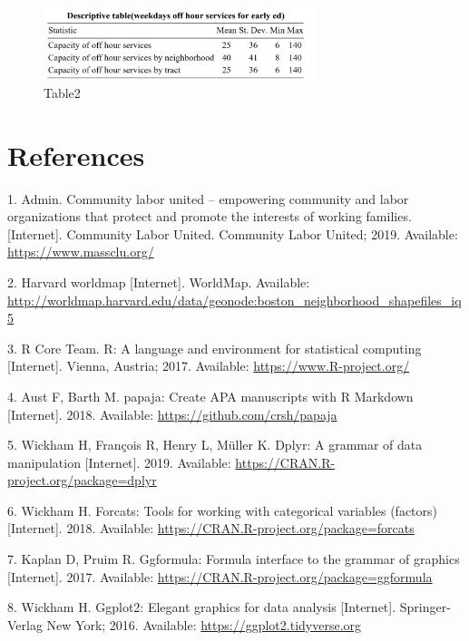 \documentclass[10pt,letterpaper]{article}
\begin{document}
\begin{figure}
\centering
\includegraphics[width=3.12500in]{table2.png}
\caption{Table2}
\end{figure}

\section*{References}\label{references.unumbered}

\hypertarget{refs}{}
\hypertarget{ref-admin_2019}{}
1. Admin. Community labor united -- empowering community and labor
organizations that protect and promote the interests of working
families. {[}Internet{]}. Community Labor United. Community Labor
United; 2019. Available: \url{https://www.massclu.org/}

\hypertarget{ref-worldmap}{}
2. Harvard worldmap {[}Internet{]}. WorldMap. Available:
\url{http://worldmap.harvard.edu/data/geonode:boston_neighborhood_shapefiles_iq5}

\hypertarget{ref-R-base}{}
3. R Core Team. R: A language and environment for statistical computing
{[}Internet{]}. Vienna, Austria; 2017. Available:
\url{https://www.R-project.org/}

\hypertarget{ref-R-papaja}{}
4. Aust F, Barth M. papaja: Create APA manuscripts with R Markdown
{[}Internet{]}. 2018. Available: \url{https://github.com/crsh/papaja}

\hypertarget{ref-R-dplyr}{}
5. Wickham H, François R, Henry L, Müller K. Dplyr: A grammar of data
manipulation {[}Internet{]}. 2019. Available:
\url{https://CRAN.R-project.org/package=dplyr}

\hypertarget{ref-R-forcats}{}
6. Wickham H. Forcats: Tools for working with categorical variables
(factors) {[}Internet{]}. 2018. Available:
\url{https://CRAN.R-project.org/package=forcats}

\hypertarget{ref-R-ggformula}{}
7. Kaplan D, Pruim R. Ggformula: Formula interface to the grammar of
graphics {[}Internet{]}. 2017. Available:
\url{https://CRAN.R-project.org/package=ggformula}

\hypertarget{ref-R-ggplot2}{}
8. Wickham H. Ggplot2: Elegant graphics for data analysis
{[}Internet{]}. Springer-Verlag New York; 2016. Available:
\url{https://ggplot2.tidyverse.org}
\end{document}
